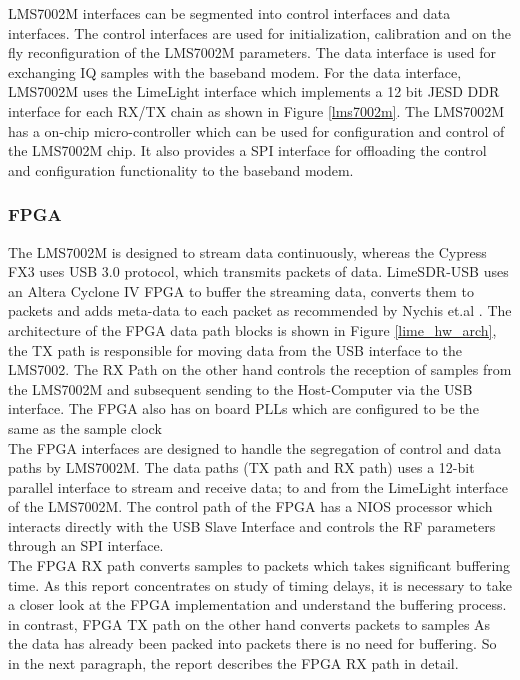 LMS7002M interfaces can be segmented into control interfaces and data interfaces.
The control interfaces are used for initialization, calibration and on the fly reconfiguration of the LMS7002M parameters.
The data interface is used for exchanging \ac{IQ} samples with the baseband modem.
For the data interface, LMS7002M uses the LimeLight interface which implements a 12 bit JESD \ac{DDR} interface for each RX/TX chain as shown in Figure \ref{lms7002m}.
The LMS7002M has a on-chip micro-controller which can be used for configuration and control of the LMS7002M chip.
It also provides a \ac{SPI} interface for offloading the control and configuration functionality to the baseband modem.


\subsubsection{FPGA}

The LMS7002M is designed to stream data continuously, whereas the Cypress FX3 uses USB 3.0 protocol, which transmits packets of data.
LimeSDR-USB uses an Altera Cyclone IV \ac{FPGA} to buffer the streaming data, converts them to packets and adds meta-data to each packet as recommended by Nychis et.al \cite{nychis_enabling_nodate}.
The architecture of the FPGA data path blocks is shown in Figure \ref{lime_hw_arch}, the TX path is responsible for moving data from the USB interface to the LMS7002.
The RX Path on the other hand controls the reception of samples from the LMS7002M and subsequent sending to the Host-Computer via the USB interface.
The \ac{FPGA} also has on board PLLs which are configured to be the same as the sample clock\\

The \ac{FPGA} interfaces are designed to handle the segregation of control and data paths by LMS7002M.
The data paths (TX path and RX path) uses a 12-bit parallel interface to stream and receive data; to and from the LimeLight interface of the LMS7002M.
The control path of the \ac{FPGA} has a NIOS processor which interacts directly with the USB Slave Interface and controls the \ac{RF} parameters through an \ac{SPI} interface.\\

The \ac{FPGA} RX path converts samples to packets which takes significant buffering time.
As this report concentrates on study of timing delays, it is necessary to take a closer look at the \ac{FPGA} implementation and understand the buffering process.
in contrast, \ac{FPGA} TX path on the other hand converts packets to samples
As the data has already been packed into packets there is no need for buffering.
So in the next paragraph, the report describes the \ac{FPGA} RX path in detail.
 

